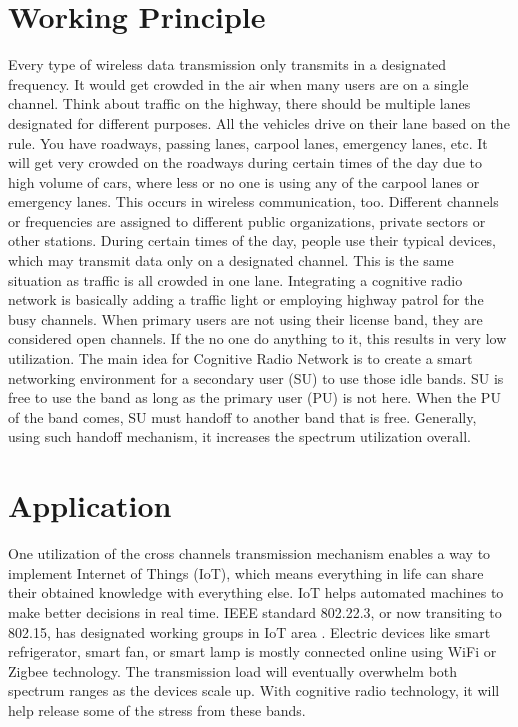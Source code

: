 \section{Working Principle}

Every type of wireless data transmission only transmits in a designated frequency. It would get crowded in the air when many users 
are on a single channel. Think about traffic on the highway, there should be multiple lanes designated for different purposes. 
All the vehicles drive on their lane based on the rule. You have roadways, passing lanes, carpool lanes, emergency lanes, etc. 
It will get very crowded on the roadways during certain times of the day due to high volume of cars, where less or no one is 
using any of the carpool lanes or emergency lanes. This occurs in wireless communication, too. Different channels or frequencies
are assigned to different public organizations, private sectors or other stations. 
During certain times of the day, people use their typical devices, which may transmit data only on a designated channel.
This is the same situation as traffic is all crowded in one lane. Integrating a cognitive radio network is basically adding a traffic light or employing highway patrol for the busy channels. When primary users are not using their license band, they are considered open channels. If the no one do anything to it, this results in very low utilization. The main idea for Cognitive Radio Network is to create
a smart networking environment for a secondary user (SU) to use those idle bands. SU is free to use the band as long as the 
primary user (PU) is not here. When the PU of the band comes, SU must handoff to another band that is free. Generally, using
such handoff mechanism, it increases the spectrum utilization overall. 


\section{Application}

One utilization of the cross channels transmission mechanism enables a way to implement Internet of Things (IoT), which means
everything in life can share their obtained knowledge with everything else. 
IoT helps automated machines to make better 
decisions in real time. IEEE standard 802.22.3, or now transiting to 802.15, has designated working groups in IoT area
\cite{ieee_working_group}. Electric devices like smart refrigerator, smart fan, or smart lamp is mostly connected online
using WiFi or Zigbee technology. The transmission load will eventually overwhelm both spectrum ranges as the devices scale
up. With cognitive radio technology, it will help release some of the stress from these bands.

